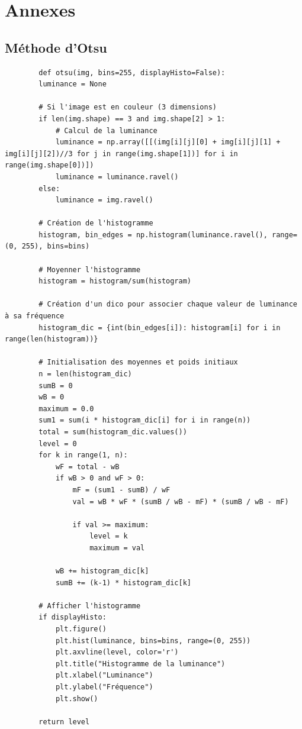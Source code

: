 \documentclass{rapport}
\begin{document}
\newpage

\section{Annexes}

\lstset{style=mystyle}

\subsection{Méthode d'Otsu}
\begin{multicols}{2}
	\begin{lstlisting}
		def otsu(img, bins=255, displayHisto=False):
		luminance = None
		
		# Si l'image est en couleur (3 dimensions)
		if len(img.shape) == 3 and img.shape[2] > 1:
			# Calcul de la luminance 
			luminance = np.array([[(img[i][j][0] + img[i][j][1] + img[i][j][2])//3 for j in range(img.shape[1])] for i in range(img.shape[0])])
			luminance = luminance.ravel()
		else:
			luminance = img.ravel()
		
		# Création de l'histogramme
		histogram, bin_edges = np.histogram(luminance.ravel(), range=(0, 255), bins=bins)
		
		# Moyenner l'histogramme
		histogram = histogram/sum(histogram)    
		
		# Création d'un dico pour associer chaque valeur de luminance à sa fréquence
		histogram_dic = {int(bin_edges[i]): histogram[i] for i in range(len(histogram))}
		
		# Initialisation des moyennes et poids initiaux
		n = len(histogram_dic)
		sumB = 0
		wB = 0
		maximum = 0.0
		sum1 = sum(i * histogram_dic[i] for i in range(n))
		total = sum(histogram_dic.values())
		level = 0
		for k in range(1, n):
			wF = total - wB
			if wB > 0 and wF > 0:
				mF = (sum1 - sumB) / wF
				val = wB * wF * (sumB / wB - mF) * (sumB / wB - mF)
				
				if val >= maximum:
					level = k
					maximum = val
			
			wB += histogram_dic[k]
			sumB += (k-1) * histogram_dic[k]
		
		# Afficher l'histogramme
		if displayHisto:
			plt.figure()
			plt.hist(luminance, bins=bins, range=(0, 255))
			plt.axvline(level, color='r')
			plt.title("Histogramme de la luminance")
			plt.xlabel("Luminance")
			plt.ylabel("Fréquence")
			plt.show()
		
		return level
	
	\end{lstlisting}
\end{multicols}
\end{document}
